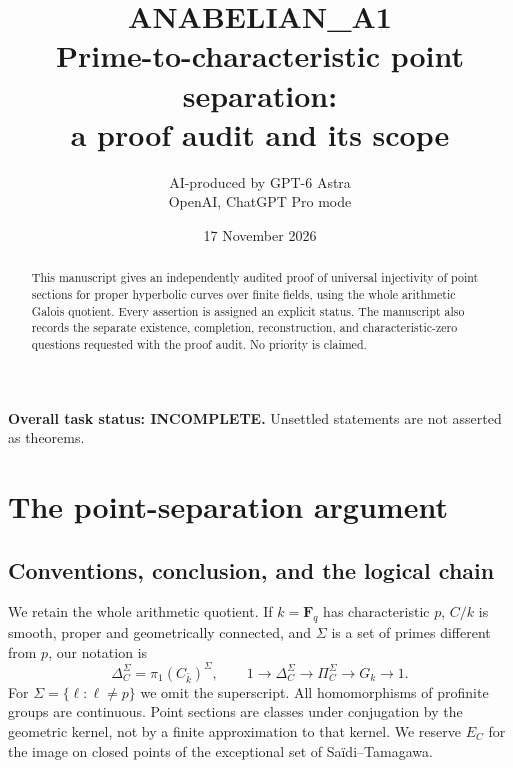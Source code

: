 \documentclass[11pt,a4paper]{article}
\title{ANABELIAN\_A1\\Prime-to-characteristic point separation:\\a proof audit and its scope}
\author{AI-produced by GPT-6 Astra\\OpenAI, ChatGPT Pro mode}
\date{17 November 2026}
\begin{document}
\maketitle
\begin{abstract}
This manuscript gives an independently audited proof of universal injectivity
of point sections for proper hyperbolic curves over finite fields, using
the whole arithmetic Galois quotient. Every assertion is assigned an
explicit status. The manuscript also records the separate existence,
completion, reconstruction, and characteristic-zero questions requested
with the proof audit. No priority is claimed.
\end{abstract}
\noindent\textbf{Overall task status: INCOMPLETE.}
Unsettled statements are not asserted as theorems.
\tableofcontents

\section{The point-separation argument}
\subsection{Conventions, conclusion, and the logical chain}
We retain the whole arithmetic quotient. If $k=\mathbf F_q$ has
characteristic $p$, $C/k$ is smooth, proper and geometrically connected,
and $\Sigma$ is a set of primes different from $p$, our notation is
\[
 \Delta_C^\Sigma=\pi_1(C_{\bar k})^\Sigma,\qquad
 1\longrightarrow\Delta_C^\Sigma\longrightarrow
 \Pi_C^\Sigma\longrightarrow G_k\longrightarrow1.
\]
For $\Sigma=\{\ell:\ell\ne p\}$ we omit the superscript. All
homomorphisms of profinite groups are continuous. Point sections are
classes under conjugation by the geometric kernel, not by a finite
approximation to that kernel. We reserve $E_C$ for the image on closed
points of the exceptional set of Sa\"idi--Tamagawa.
\end{document}
